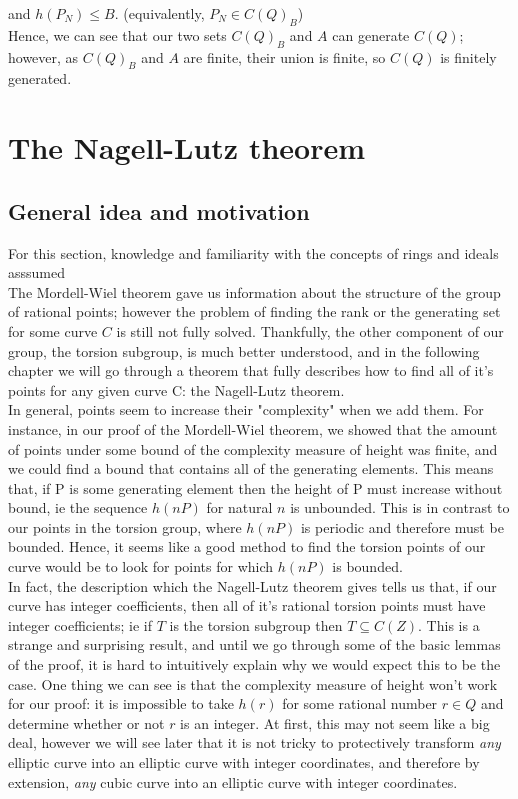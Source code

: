 \documentclass{article}
\begin{document}
and $h(P_N) \leq B$. (equivalently, $P_N \in C(Q)_B$)\\

Hence, we can see that our two sets $C(Q)_B$ and $A$ can generate $C(Q)$; however, as $C(Q)_B$ and $A$ are finite, their union is finite, so $C(Q)$ is finitely generated.


\newpage

\section{The Nagell-Lutz theorem}

\subsection{General idea and motivation}

For this section, knowledge and familiarity with the concepts of rings and ideals asssumed\\

The Mordell-Wiel theorem gave us information about the structure of the group of rational points; however the problem of finding the rank or the generating set for some curve $C$ is still not fully solved. Thankfully, the other component of our group, the torsion subgroup, is much better understood, and in the following chapter we will go through a theorem that fully describes how to find all of it's points for any given curve C: the Nagell-Lutz theorem.\\

In general, points seem to increase their "complexity" when we add them. For instance, in our proof of the Mordell-Wiel theorem, we showed that the amount of points under some bound of the complexity measure of height was finite, and we could find a bound that contains all of the generating elements. This means that, if P is some generating element then the height of P must increase without bound, ie the sequence $h(nP)$ for natural $n$ is unbounded. This is in contrast to our points in the torsion group, where $h(nP)$ is periodic and therefore must be bounded. Hence, it seems like a good method to find the torsion points of our curve would be to look for points for which $h(nP)$ is bounded.\\

In fact, the description which the Nagell-Lutz theorem gives tells us that, if our curve has integer coefficients, then all of it's rational torsion points must have integer coefficients; ie if $T$ is the torsion subgroup then $T \subseteq C(Z)$. This is a strange and surprising result, and until we go through some of the basic lemmas of the proof, it is hard to intuitively explain why we would expect this to be the case. One thing we can see is that the complexity measure of height won't work for our proof: it is impossible to take $h(r)$ for some rational number $r \in Q$ and determine whether or not $r$ is an integer. At first, this may not seem like a big deal, however we will see later that it is not tricky to protectively transform \emph{any} elliptic curve into an elliptic curve with integer coordinates, and therefore by extension, \emph{any} cubic curve into an elliptic curve with integer coordinates.\\
\end{document}
